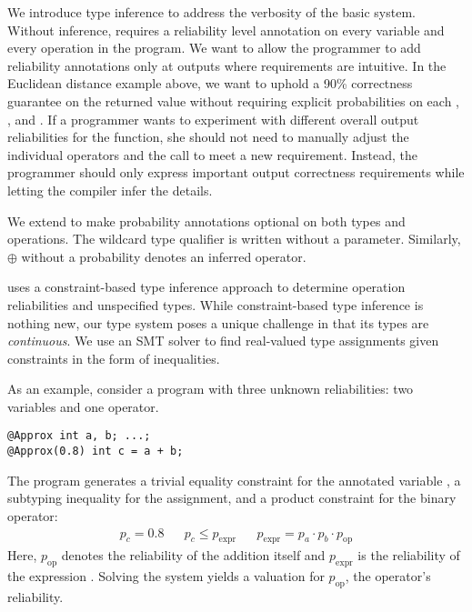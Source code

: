 {We introduce type inference to address the verbosity of the basic system.
Without inference, \lang requires a reliability level annotation on every
variable and every operation in the program.
We want to allow the programmer to add reliability annotations only at
outputs where requirements are intuitive.
In the Euclidean distance example above, we want to uphold a 90\% correctness
guarantee on the returned value without requiring explicit probabilities on
each \code{+}, \code{*}, and .
If a programmer wants to experiment with different overall output reliabilities
for the  function, she should not need to manually adjust the
individual operators and the  call to meet a new requirement.
Instead, the programmer should only express important output correctness
requirements while letting the compiler infer the details.

We extend \lang to make probability annotations optional on both types and
operations.
The wildcard type qualifier is written  without a
parameter.
Similarly, $\oplus$ without a probability denotes an inferred operator.


\lang uses a constraint-based type inference approach to determine operation
reliabilities and unspecified types.
While constraint-based type inference is nothing new, our type system poses a
unique challenge in that its types are \emph{continuous}.
We use an SMT solver to find real-valued type assignments given
constraints in the form of inequalities.

As an example, consider a program with three unknown reliabilities: two
variables and one operator.
%
\begin{lstlisting}
@Approx int a, b; ...;
@Approx(0.8) int c = a + b;
\end{lstlisting}
%
The program generates a trivial equality constraint for the annotated variable
,
a subtyping inequality for the assignment,
and a product constraint for the binary operator:
\begin{align*}
    p_c = 0.8 &&
    p_c \le p_\text{expr} &&
    p_\text{expr} = p_a \cdot p_b \cdot p_\text{op}
\end{align*}
%
Here, $p_\text{op}$ denotes the reliability of the addition itself and
$p_\text{expr}$ is the reliability of the expression .
Solving the system yields a valuation for $p_\text{op}$, the operator's reliability.

}
